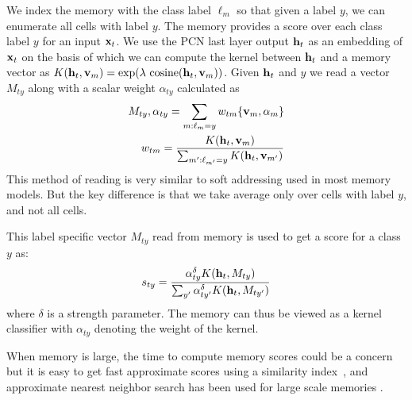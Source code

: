 \documentclass[letterpaper]{article} %
\newcommand{\vek}[1]{{\bf {#1}}}
\newcommand{\vx}{{\vek{x}}}
\newcommand{\vh}{{\vek{h}}}
\newcommand{\vM}{{\vek{v}}}
\newcommand{\util}{{\alpha}}
\newcommand{\lmm}{{s}}
\begin{document}
We index the memory with the class label $\ell_m$  so that given a label $y$, we can enumerate all cells with label $y$.  The memory provides a score over each class label $y$ for an input $\vx_t$.
We use the PCN last layer output $\vh_t$ as an embedding of $\vx_t$ on the basis of which we can compute the kernel  between $\vh_t$ and a memory vector as  $K(\vh_t,\vM_m) = \exp(\lambda ~\text{cosine}(\vh_t,\vM_m))$.
%
Given $\vh_t$ and $y$ we read a vector $M_{ty}$ along with a scalar weight $\alpha_{ty}$ calculated as
\begin{equation}
\label{eq-mem-read}
\begin{split}
 M_{ty},\alpha_{ty} = \sum_{m:\ell_m = y} w_{tm}\{\vM_m,\util_m\} \\ 
 w_{tm} =  \frac{K(\vh_t,\vM_m)}{\sum_{m': \ell_{m'} = y} K(\vh_t,\vM_{m'}) }
\end{split}
\end{equation}
This method of reading is very similar to soft addressing used in most memory models.  But the key difference is that we take average only over cells with label $y$, and not all cells.


This label specific vector $M_{ty}$ read from memory is used to get a score for a class $y$ as:
\begin{equation}
\label{eq-mem-score}
\lmm_{ty}  = \frac{\alpha_{ty}^\delta K(\vh_t, M_{ty})} { \sum_{y'} \alpha_{ty'}^\delta K(\vh_t, M_{ty'})}
\end{equation}
where $\delta$ is a strength parameter. The memory can thus be viewed as a kernel classifier with $\alpha_{ty}$ denoting the weight of the kernel.


When memory is large, the time to compute memory scores could be a concern but it is easy to get fast approximate scores using a similarity index~\cite{Guo16,kaiser2017}, and approximate nearest neighbor search has been used for large scale memories \cite{RaeHHDSWGL16,chandarSHPGY16}.
\end{document}
